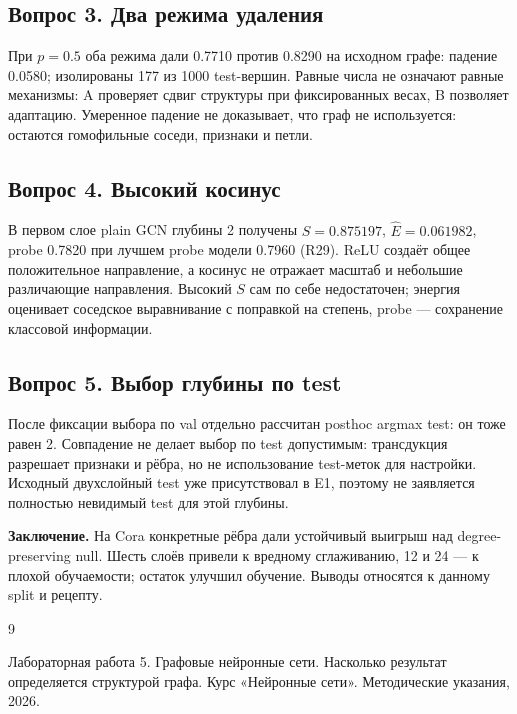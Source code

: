 \subsection*{Вопрос 3. Два режима удаления}
При $p=0.5$ оба режима дали 0.7710 против 0.8290 на исходном графе: падение 0.0580; изолированы 177 из 1000 test-вершин. Равные числа не означают равные механизмы: A проверяет сдвиг структуры при фиксированных весах, B позволяет адаптацию. Умеренное падение не доказывает, что граф не используется: остаются гомофильные соседи, признаки и петли.
\subsection*{Вопрос 4. Высокий косинус}
В первом слое plain GCN глубины 2 получены $S=0.875197$, $\hat E=0.061982$, probe 0.7820 при лучшем probe модели 0.7960 (R29). ReLU создаёт общее положительное направление, а косинус не отражает масштаб и небольшие различающие направления. Высокий $S$ сам по себе недостаточен; энергия оценивает соседское выравнивание с поправкой на степень, probe --- сохранение классовой информации.
\subsection*{Вопрос 5. Выбор глубины по test}
После фиксации выбора по val отдельно рассчитан posthoc argmax test: он тоже равен 2. Совпадение не делает выбор по test допустимым: трансдукция разрешает признаки и рёбра, но не использование test-меток для настройки. Исходный двухслойный test уже присутствовал в E1, поэтому не заявляется полностью невидимый test для этой глубины.

\noindent\textbf{Заключение.} На Cora конкретные рёбра дали устойчивый выигрыш над degree-preserving null. Шесть слоёв привели к вредному сглаживанию, 12 и 24 --- к плохой обучаемости; остаток улучшил обучение. Выводы относятся к данному split и рецепту.
\clearpage
\renewcommand{\refname}{Список использованных источников}
\begin{thebibliography}{9}
 Лабораторная работа 5. Графовые нейронные сети. Насколько результат определяется структурой графа. Курс «Нейронные сети». Методические указания, 2026.
\end{thebibliography}
\clearpage
